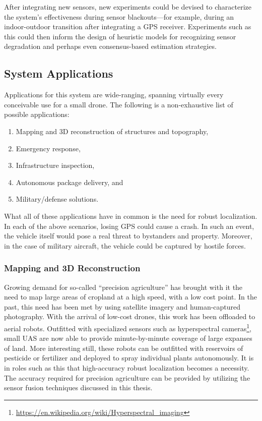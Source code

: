 After integrating new sensors, new experiments could be devised to characterize the system's effectiveness during sensor blackouts---for example, during an indoor-outdoor transition after integrating a GPS receiver. Experiments such as this could then inform the design of heuristic models for recognizing sensor degradation and perhaps even consensus-based estimation strategies. 

\subsection{System Applications}

Applications for this system are wide-ranging, spanning virtually every conceivable use for a small drone. The following is a non-exhaustive list of possible applications:
\begin{enumerate}
    \item Mapping and 3D reconstruction of structures and topography,
    \item Emergency response,
    \item Infrastructure inspection,
    \item Autonomous package delivery, and
    \item Military/defense solutions.
\end{enumerate}
What all of these applications have in common is the need for robust localization. In each of the above scenarios, losing GPS could cause a crash. In such an event, the vehicle itself would pose a real threat to bystanders and property. Moreover, in the case of military aircraft, the vehicle could be captured by hostile forces.

\subsubsection{Mapping and 3D Reconstruction}

Growing demand for so-called ``precision agriculture'' has brought with it the need to map large areas of cropland at a high speed, with a low cost point. In the past, this need has been met by using satellite imagery and human-captured photography. With the arrival of low-cost drones, this work has been offloaded to aerial robots. Outfitted with specialized sensors such as hyperspectral cameras\footnote{\url{https://en.wikipedia.org/wiki/Hyperspectral_imaging}}, small UAS are now able to provide minute-by-minute coverage of large expanses of land. More interesting still, these robots can be outfitted with reservoirs of pesticide or fertilizer and deployed to spray individual plants autonomously. It is in roles such as this that high-accuracy robust localization becomes a necessity. The accuracy required for precision agriculture can be provided by utilizing the sensor fusion techniques discussed in this thesis.

